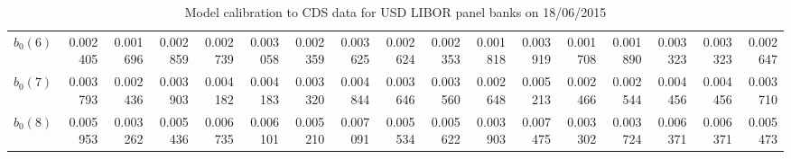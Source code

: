 \documentclass[12pt,a4paper]{article}
\theoremstyle{plain}
\numberwithin{equation}{section}
\begin{document}
\begin{table}[t]
\begin{subtable}{.5\textwidth}
{\begin{tabular}{|l|rrrrrrrrrrrrrrr|r|}
    $\hat{b}_0(6) $  & 0.002405 & 0.001696 & 0.002859 & 0.002739 & 0.003058 & 0.002359 & 0.003625 & 0.002624 & 0.002353 & 0.001818 & 0.003919 & 0.001708 & 0.001890 & 0.003323 & 0.003323 & 0.002647 \\
    $\hat{b}_0(7)$   & 0.003793 & 0.002436 & 0.003903 & 0.004182 & 0.004183 & 0.003320 & 0.004844 & 0.003646 & 0.003560 & 0.002648 & 0.005213 & 0.002466 & 0.002544 & 0.004456 & 0.004456 & 0.003710 \\
    $\hat{b}_0(8)$   & 0.005953 & 0.003262 & 0.005436 & 0.006735 & 0.006101 & 0.005210 & 0.007091 & 0.005534 & 0.005622 & 0.003903 & 0.007475 & 0.003302 & 0.003724 & 0.006371 & 0.006371 & 0.005473 \\

    \bottomrule
    \end{tabular}%
    }
  \end{subtable}
   \caption{Model calibration to CDS data for USD LIBOR panel banks on 18/06/2015}
\end{table}%
\end{document}
